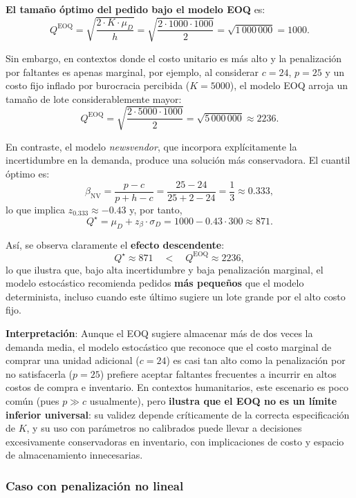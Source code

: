 \documentclass[
  spanish,
  us-letterpaper,
]{scrreprt}
\numberwithin{equation}{section}
\begin{document}
\textbf{El tamaño óptimo del pedido bajo el modelo EOQ} es: \[
Q^{\text{EOQ}} = \sqrt{\frac{2 \cdot K \cdot \mu_D}{h}} = \sqrt{\frac{2 \cdot 1000 \cdot 1000}{2}} = \sqrt{1\,000\,000} = 1000.
\]

Sin embargo, en contextos donde el costo unitario es más alto y la
penalización por faltantes es apenas marginal, por ejemplo, al
considerar \(c = 24\), \(p = 25\) y un costo fijo inflado por burocracia
percibida (\(K = 5000\)), el modelo EOQ arroja un tamaño de lote
considerablemente mayor: \[
Q^{\text{EOQ}} = \sqrt{\frac{2 \cdot 5000 \cdot 1000}{2}} = \sqrt{5\,000\,000} \approx 2236.
\]

En contraste, el modelo \emph{newsvendor}, que incorpora explícitamente
la incertidumbre en la demanda, produce una solución más conservadora.
El cuantil óptimo es: \[
\beta_{\text{NV}} = \frac{p - c}{p + h - c} = \frac{25 - 24}{25 + 2 - 24} = \frac{1}{3} \approx 0.333,
\] lo que implica \(z_{0.333} \approx -0.43\) y, por tanto, \[
Q^\star = \mu_D + z_{\beta} \cdot \sigma_D = 1000 - 0.43 \cdot 300 \approx 871.
\]

Así, se observa claramente el \textbf{efecto descendente}:\\
\[
Q^\star \approx 871 \quad < \quad Q^{\text{EOQ}} \approx 2236,
\] lo que ilustra que, bajo alta incertidumbre y baja penalización
marginal, el modelo estocástico recomienda pedidos \textbf{más pequeños}
que el modelo determinista, incluso cuando este último sugiere un lote
grande por el alto costo fijo.

\textbf{Interpretación}: Aunque el EOQ sugiere almacenar más de dos
veces la demanda media, el modelo estocástico que reconoce que el costo
marginal de comprar una unidad adicional (\(c=24\)) es casi tan alto
como la penalización por no satisfacerla (\(p=25\)) prefiere aceptar
faltantes frecuentes a incurrir en altos costos de compra e inventario.
En contextos humanitarios, este escenario es poco común (pues
\(p \gg c\) usualmente), pero \textbf{ilustra que el EOQ no es un límite
inferior universal}: su validez depende críticamente de la correcta
especificación de \(K\), y su uso con parámetros no calibrados puede
llevar a decisiones excesivamente conservadoras en inventario, con
implicaciones de costo y espacio de almacenamiento innecesarias.

\subsubsection{Caso con penalización no
lineal}\label{caso-con-penalizaciuxf3n-no-lineal}
\end{document}
